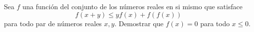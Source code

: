 Sea $f$ una función del conjunto de los números reales en si mismo que satisface
\[f(x + y) \leq yf(x) + f(f(x))\]
para todo par de números reales $x, y$. Demostrar que $f(x) = 0$ para todo $x \leq 0$.